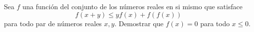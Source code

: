 Sea $f$ una función del conjunto de los números reales en si mismo que satisface
\[f(x + y) \leq yf(x) + f(f(x))\]
para todo par de números reales $x, y$. Demostrar que $f(x) = 0$ para todo $x \leq 0$.